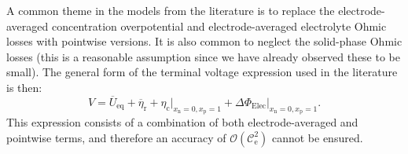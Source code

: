 \documentclass[a4paper]{article}
\newcommand{\ts}[1]{_{\text{#1}}}
\newcommand{\mybar}{\overline}
\begin{document}
A common theme in the models from the literature is to replace the electrode-averaged concentration overpotential and electrode-averaged electrolyte Ohmic losses with pointwise versions. It is also common to neglect the solid-phase Ohmic losses (this is a reasonable assumption since we have already observed these to be small). The general form of the terminal voltage expression used in the literature is then: 
\begin{equation} \label{eqn:literature-pointwise-voltage}
  V = \mybar{U}\ts{eq} + \mybar{\eta}\ts{r} + \eta\ts{c}\big|_{x\ts{n}=0,x\ts{p}=1} + \Delta\Phi\ts{Elec}\big|_{x\ts{n}=0, x\ts{p}=1}.
\end{equation}
This expression consists of a combination of both electrode-averaged and pointwise terms, and therefore an accuracy of $\mathcal{O}(\mathcal{C}\ts{e}^2)$ cannot be ensured.
\end{document}
